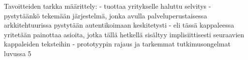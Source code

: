 Tavoitteiden tarkka määrittely:
- tuottaa yritykselle haluttu selvitys
- pystytäänkö tekemään järjestelmä, jonka avulla palveluperustaisessa arkkitehtuurissa pystytään autentikoimaan keskitetysti
- eli tässä kappaleessa yritetään painottaa asioita, jotka tällä hetkellä sisältyy implisiittisesti seuraavien kappaleiden teksteihin
- prototyypin rajaus ja tarkemmat tutkimusongelmat luvussa 5

